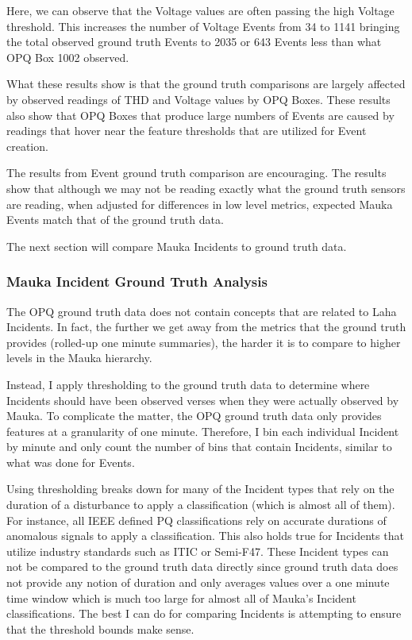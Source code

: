 Here, we can observe that the Voltage values are often passing the high Voltage threshold. This increases the number of Voltage Events from 34 to 1141 bringing the total observed ground truth Events to 2035 or 643 Events less than what OPQ Box 1002 observed.

What these results show is that the ground truth comparisons are largely affected by observed readings of THD and Voltage values by OPQ Boxes. These results also show that OPQ Boxes that produce large numbers of Events are caused by readings that hover near the feature thresholds that are utilized for Event creation.

The results from Event ground truth comparison are encouraging. The results show that although we may not be reading exactly what the ground truth sensors are reading, when adjusted for differences in low level metrics, expected Mauka Events match that of the ground truth data.

The next section will compare Mauka Incidents to ground truth data.

\subsubsection{Mauka Incident Ground Truth Analysis}

The OPQ ground truth data does not contain concepts that are related to Laha Incidents. In fact, the further we get away from the metrics that the ground truth provides (rolled-up one minute summaries), the harder it is to compare to higher levels in the Mauka hierarchy.

Instead, I apply thresholding to the ground truth data to determine where Incidents should have been observed verses when they were actually observed by Mauka. To complicate the matter, the OPQ ground truth data only provides features at a granularity of one minute. Therefore, I bin each individual Incident by minute and only count the number of bins that contain Incidents, similar to what was done for Events.

Using thresholding breaks down for many of the Incident types that rely on the duration of a disturbance to apply a classification (which is almost all of them). For instance, all IEEE defined PQ classifications rely on accurate durations of anomalous signals to apply a classification. This also holds true for Incidents that utilize industry standards such as ITIC or Semi-F47. These Incident types can not be compared to the ground truth data directly since ground truth data does not provide any notion of duration and only averages values over a one minute time window which is much too large for almost all of Mauka's Incident classifications. The best I can do for comparing Incidents is attempting to ensure that the threshold bounds make sense.

